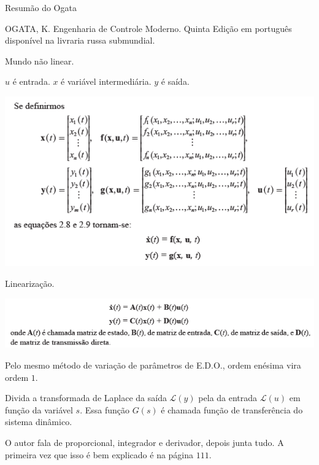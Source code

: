 \documentclass[12pt]{article}
\begin{document}
\Large

\begin{center}
Resum\~ao do Ogata
\end{center}

\normalsize

OGATA, K. Engenharia de Controle Moderno. Quinta Edi\c{c}\~ao em portugu\^es dispon\'ivel na livraria russa submundial.

\vspace{3mm}

Mundo n\~ao linear.

$u$ \'e entrada. $x$ \'e vari\'avel intermedi\'aria. $y$ \'e sa\'ida.

		\begin{center}
		\includegraphics{26}
		\end{center}

Lineariza\c{c}\~ao.

		\begin{center}
		\includegraphics{27}
		\end{center}

Pelo mesmo m\'etodo de varia\c{c}\~ao de par\^ametros de E.D.O., ordem en\'esima vira ordem $1$.

Divida a transformada de Laplace da sa\'ida $\mathcal{L}(y)$ pela da entrada $\mathcal{L}(u)$ em fun\c{c}\~ao da vari\'avel $s$. Essa fun\c{c}\~ao $G(s)$ \'e chamada fun\c{c}\~ao de transfer\^encia do sistema din\^amico.

O autor fala de proporcional, integrador e derivador, depois junta tudo. A primeira vez que isso \'e bem explicado \'e na p\'agina $111$.
\end{document}
